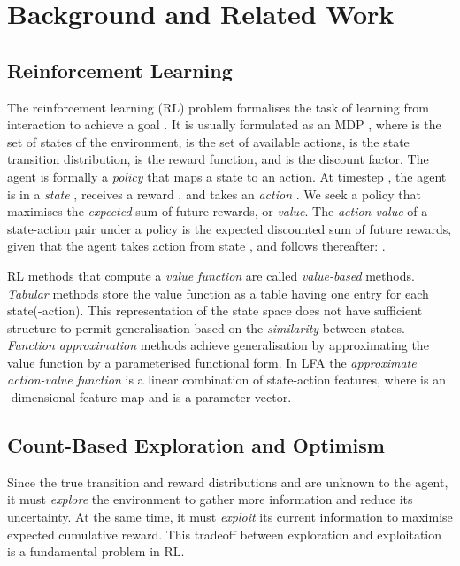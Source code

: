 \documentclass{article}
\theoremstyle{definition}
\theoremstyle{definition}
\theoremstyle{plain}
\theoremstyle{plain}
\theoremstyle{plain}
\begin{document}
\section{Background and Related Work}


\subsection{Reinforcement Learning}

The reinforcement learning (RL) problem formalises the task of learning
from interaction to achieve a goal \cite{Sutton1998}. It is usually
formulated as an MDP ,
where  is the set of states of the environment, 
is the set of available actions, 
is the state transition distribution, 
is the reward function, and  is the discount factor. The
agent is formally a \emph{policy }
that maps a state to an action. At timestep , the agent is in
a \emph{state} , receives a reward ,
and takes an \emph{action} . We seek a policy
 that maximises the \emph{expected }sum of future rewards, or
\emph{value}. The\emph{ action-value } of a state-action
pair  under a policy  is the expected
discounted sum of future rewards, given that the agent takes action
 from state , and follows  thereafter: . 

RL methods that compute a \emph{value function }are called \emph{value-based}
methods. \emph{Tabular} methods store the value function as a table
having one entry for each state(-action).\emph{ }This representation
of the state space does not have sufficient structure to permit generalisation
based on the \emph{similarity} between states. \emph{Function approximation}
methods achieve generalisation by approximating the value function\emph{
}by a parameterised functional form. In LFA the \emph{approximate
action-value function} 
is a linear combination of state-action features, where 
is an -dimensional feature map and 
is a parameter vector. 


\subsection{Count-Based Exploration and Optimism}

Since the true transition and reward distributions 
and  are unknown to the agent, it must \emph{explore}
the environment to gather more information and reduce its uncertainty.
At the same time, it must \emph{exploit} its current information to
maximise expected cumulative reward. This tradeoff between exploration
and exploitation is a fundamental problem in RL.
\end{document}
